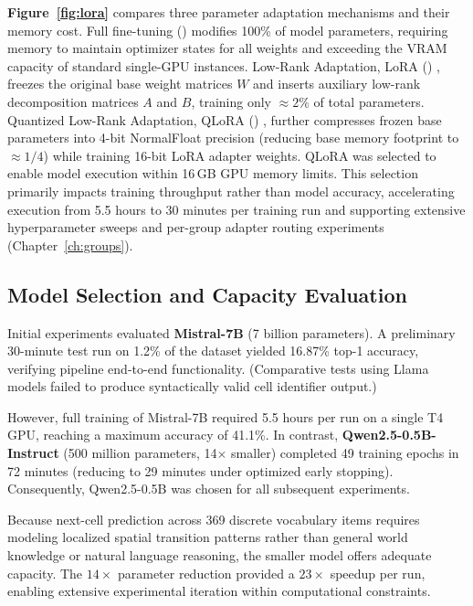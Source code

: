 \textbf{Figure~\ref{fig:lora}} compares three parameter adaptation mechanisms and their memory cost. Full fine-tuning (\textbf{}) modifies 100\% of model parameters, requiring memory to maintain optimizer states for all weights and exceeding the VRAM capacity of standard single-GPU instances. Low-Rank Adaptation, LoRA (\textbf{}) \textbf{\cite{hu2022lora}}, freezes the original base weight matrices $W$ and inserts auxiliary low-rank decomposition matrices $A$ and $B$, training only $\approx 2\%$ of total parameters. Quantized Low-Rank Adaptation, QLoRA (\textbf{}) \textbf{\cite{dettmers2023qlora}}, further compresses frozen base parameters into 4-bit NormalFloat precision (reducing base memory footprint to $\approx 1/4$) while training 16-bit LoRA adapter weights. QLoRA was selected to enable model execution within 16\,GB GPU memory limits. This selection primarily impacts training throughput rather than model accuracy, accelerating execution from 5.5 hours to 30 minutes per training run and supporting extensive hyperparameter sweeps and per-group adapter routing experiments (Chapter~\ref{ch:groups}).



\subsection{Model Selection and Capacity Evaluation}
\label{sec:tools-model}

Initial experiments evaluated \textbf{Mistral-7B} \textbf{\cite{jiang2023mistral}} (7 billion parameters). A preliminary 30-minute test run on 1.2\% of the dataset yielded 16.87\% top-1 accuracy, verifying pipeline end-to-end functionality. (Comparative tests using Llama models failed to produce syntactically valid cell identifier output.)

However, full training of Mistral-7B required 5.5 hours per run on a single T4 GPU, reaching a maximum accuracy of 41.1\%. In contrast, \textbf{Qwen2.5-0.5B-Instruct} \textbf{\cite{qwen2025}} (500 million parameters, 14$\times$ smaller) completed 49 training epochs in 72 minutes (reducing to 29 minutes under optimized early stopping). Consequently, Qwen2.5-0.5B was chosen for all subsequent experiments.

Because next-cell prediction across 369 discrete vocabulary items requires modeling localized spatial transition patterns rather than general world knowledge or natural language reasoning, the smaller model offers adequate capacity. The $14\times$ parameter reduction provided a $23\times$ speedup per run, enabling extensive experimental iteration within computational constraints.

